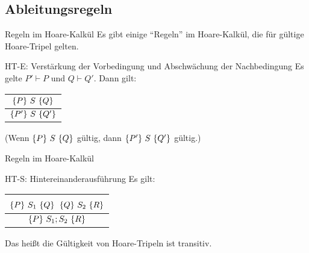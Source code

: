 \subsection{Ableitungsregeln}

\begin{frame}{Regeln im Hoare-Kalkül}
	Es gibt einige ``Regeln'' im Hoare-Kalkül, die für gültige Hoare-Tripel gelten.

	\begin{block}{HT-E: Verstärkung der Vorbedingung und Abschwächung der Nachbedingung}
		Es gelte $P' \vdash P$ und $Q\vdash Q'$. Dann gilt:
		 \begin{center}\begin{tabular}{c}
						$\left\{ P \right\} \, S \, \left\{ Q \right\}$\\
						\midrule
						$\left\{ P' \right\} \, S \, \left\{ Q' \right\}$
		\end{tabular}\end{center}
		(Wenn $\left\{ P \right\} \, S \, \left\{ Q \right\}$ gültig, dann $\left\{ P' \right\} \, S \, \left\{ Q' \right\}$ gültig.)
	\end{block}

\end{frame}

\begin{frame}{Regeln im Hoare-Kalkül}

	\begin{block}{HT-S: Hintereinanderausführung}
		Es gilt: \begin{center}\begin{tabular}{c}
			$\left\{ P \right\} \, S_1 \, \left\{ Q \right\}$ \qquad $\left\{ Q \right\} \, S_2 \, \left\{ R \right\}$\\
			\midrule
			$\left\{ P \right\} \, S_1 ; S_2 \, \left\{ R \right\}$
		\end{tabular}\end{center}
		Das heißt die Gültigkeit von Hoare-Tripeln ist transitiv. 
		
	\end{block}
\end{frame}

